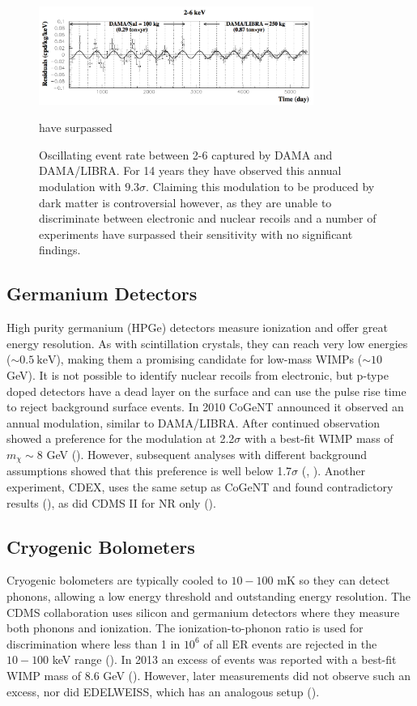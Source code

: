 \begin{figure}
\centering
\includegraphics[width=0.8\textwidth]{DAMAModulation}
\caption{Oscillating event rate between 2-6 \kevee captured by DAMA and DAMA/LIBRA.  For 14 years they have observed this annual
modulation with $9.3\sigma$.  Claiming this modulation to be produced by dark matter is controversial however, as they are unable to
discriminate between electronic and nuclear recoils and a number of experiments have surpassed their sensitivity with no significant
findings.}
have surpassed 
\label{fig:dama}
\end{figure}

\subsection{Germanium Detectors} \label{subsec:germanium}
High purity germanium (HPGe) detectors measure ionization and offer great energy resolution.  As with scintillation crystals,
they can reach very low energies ($\sim 0.5\ \mathrm{keV}$), making them a promising candidate for low-mass WIMPs ($\sim 10$ GeV).  It is not
possible to identify nuclear recoils from electronic, but p-type doped detectors have a dead layer on the surface and can use the
pulse rise time to reject background surface events.  In 2010 CoGeNT
announced it observed an annual modulation, similar to DAMA/LIBRA.  After continued observation showed a preference for the modulation
at 2.2$\sigma$ with a best-fit WIMP mass of $m_{\chi}\sim 8$ GeV ().  However, subsequent analyses with different
background assumptions showed that this preference is well below 1.7$\sigma$ (, ).  Another
experiment, CDEX, uses the same setup as CoGeNT and found contradictory results (), as did CDMS II for NR only
().


\subsection{Cryogenic Bolometers} \label{subsec:bolometers}
Cryogenic bolometers are typically cooled to $10-100$ mK so they can detect phonons, allowing a low energy threshold and
outstanding energy resolution.  The CDMS collaboration uses silicon and germanium detectors where they measure both phonons
and ionization.  The ionization-to-phonon ratio is used for discrimination where less than 1 in $10^{6}$ of all ER events
are rejected in the $10-100$ keV range ().  In 2013 an excess of events was reported with a best-fit
WIMP mass of 8.6 GeV ().  However, later measurements did not observe such an excess, nor did EDELWEISS,
which has an analogous setup ().

